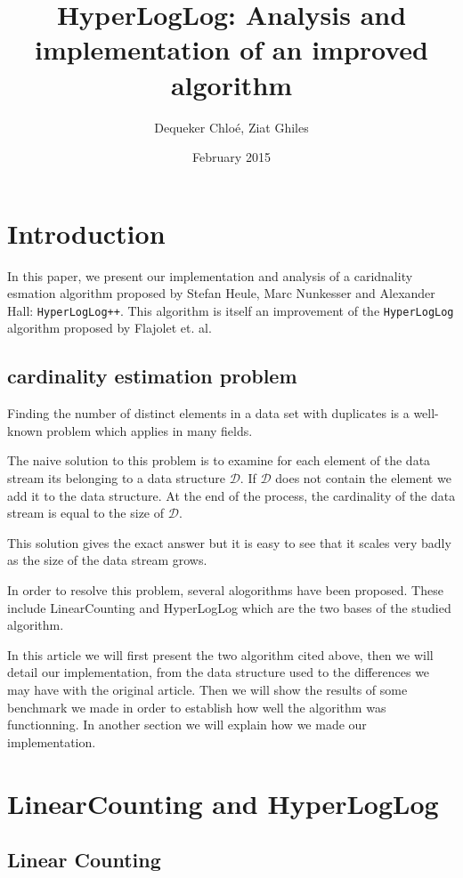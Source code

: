 \documentclass{article}
\title{HyperLogLog: Analysis and implementation of an improved algorithm}
\author{Dequeker Chlo\'e, Ziat Ghiles}
\date{February 2015}
\begin{document}
\maketitle
\clearpage

\tableofcontents
\clearpage

\section{Introduction}
In this paper, we present our implementation and analysis of a
caridnality esmation algorithm proposed by Stefan Heule, Marc
Nunkesser and Alexander Hall: \texttt{HyperLogLog++}. This algorithm
is itself an improvement of the \texttt{HyperLogLog} algorithm
proposed by Flajolet et. al.

\subsection{cardinality estimation problem}
Finding the number of distinct elements in a data set with duplicates
is a well-known problem which applies in many fields.

The naive solution to this problem is to examine for each element of
the data stream its belonging to a data structure $\mathcal{D}$. If
$\mathcal{D}$ does not contain the element we add it to the data
structure. At the end of the process, the cardinality of the data
stream is equal to the size of $\mathcal{D}$.

This solution gives the exact answer but it is easy to see that it
scales very badly as the size of the data stream grows.

In order to resolve this problem, several alogorithms have been
proposed. These include LinearCounting and HyperLogLog which are the two
bases of the studied algorithm.

In this article we will first present the two algorithm cited above,
then we will detail our implementation, from the data structure used
to the differences we may have with the original article. Then we will
show the results of some benchmark we made in order to establish how
well the algorithm was functionning. In another section we will
explain how we made our implementation.

\clearpage
\section{LinearCounting and HyperLogLog}
\subsection{Linear Counting}
\end{document}
